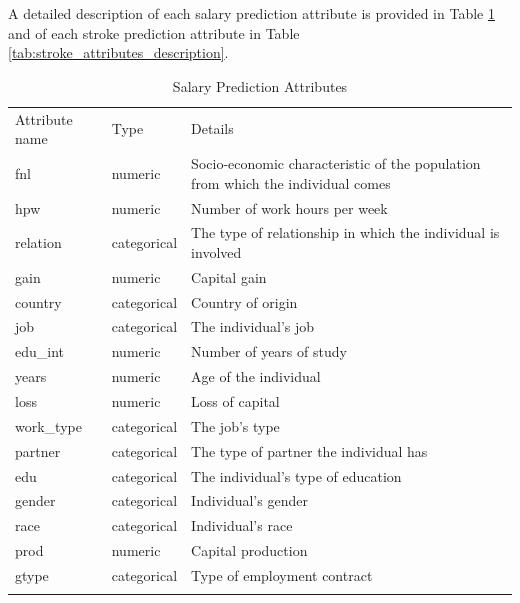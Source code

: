 \documentclass[runningheads]{paper}
\begin{document}
A detailed description of each salary prediction attribute is provided in Table
\ref{tab:salary_attributes_description} and of each stroke  prediction attribute
in Table \ref{tab:stroke_attributes_description}.

\begin{center}
    \begin{longtable}{ |>{\centering\arraybackslash}p{3cm}||>{\centering\arraybackslash}p{2cm}|>{\centering\arraybackslash}p{6cm}| }
        \hline
        \multicolumn{3}{|c|}{List of all attributes in the Salary Prediction dataset} \\
        \hline
        Attribute name & Type & Details \\
        \hline
        fnl & numeric & Socio-economic characteristic of the population from which the individual comes \\
        \hline
        hpw & numeric & Number of work hours per week \\
        \hline
        relation & categorical & The type of relationship in which the individual is involved \\
        \hline
        gain & numeric & Capital gain \\
        \hline
        country & categorical & Country of origin \\
        \hline
        job & categorical & The individual's job \\
        \hline
        edu\_int & numeric & Number of years of study \\
        \hline
        years & numeric & Age of the individual \\
        \hline
        loss & numeric & Loss of capital \\
        \hline
        work\_type & categorical & The job's type \\
        \hline
        partner & categorical & The type of partner the individual has \\
        \hline
        edu & categorical & The individual's type of education \\
        \hline
        gender & categorical & Individual's gender \\
        \hline
        race & categorical & Individual's race \\
        \hline
        prod & numeric & Capital production \\
        \hline
        gtype & categorical & Type of employment contract \\
        \hline
        \caption{Salary Prediction Attributes}
        \label{tab:salary_attributes_description}
   \end{longtable}
\end{center}
\end{document}
